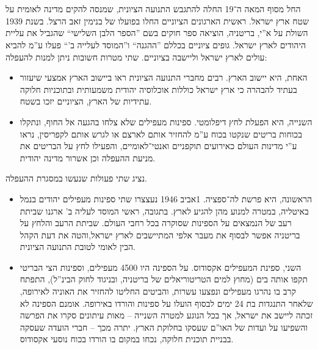 \documentclass[]{../../../../tex/classes/homework}
\begin{document}
	\section{}
	החל מסוף המאה ה־19 החלה להתגבש התנועה הציונית, שמנסה להקים מדינה לאומית על שטח ארץ ישראל. ראשית הארגונים הציוניים החלו בפועלו של בנימין זאב הרצל. בשנת 1939 השולת על א''י, בריטניה, הוציאה ספר חוקים בשם ''הספר הלבן השלישי`` שהגביל את עליית היהודים לארץ ישראל. גופים ציוניים בכללם ''ההגנה`` ו''המוסד לעלייה ב'`` פעלו ע''מ להביא עולים לארץ ישראל וליישבה בציוניים. שתי מטרות חשובות ניתן למנות להעפלה: 
	\begin{itemize}
		\item האחת, היא יישוב הארץ. רבים מחברי התנועה הציונית ראו ביישוב הארץ אמצעי שיעזור בעתיד להבהרה כי ארץ ישראל כוללות אוכלוסיה יהודית משמעותית ובתוכניות חלוקה עתידיות של הארץ, הציוניים יזכו בשטח. 
		\item השנייה, היא הפעלת לחץ דיפלומטי. ספינות מעפילים שלא צלחו בהגעה אל החוף, ונתקלו בכוחות בריטים שנקטו בכוח ע''מ להחזיר אותם לארצם או לגרש אותם לקפריסין, נראו ע''י מדינות העולם כאירועים תוקפניים ואנטי־לאומיים, והפעילו לחץ על הבריטים את מניעת ההעפלה וכן אשרור מדינה יהודית. 
	\end{itemize}
	נציג שתי פעולות שנעשו במסגרת ההעפלה. 
	\begin{itemize}
		\item הראשונה, היא פרשת לה־ספציה. 1אביב 1946 נעצצרו שתי ספינות מעפילים יהודים בנמל באיטליה, במטרה למנוע מהן להגיע לארץ. בתגובה, ראשי המוסד לעליה ב' ארגנו שביתת רעב של הנמצאים על הספינות שסוקרה בכל רחבי העולם. שביתת הרעב והלחץ על בריטניה אפשר לבסוף את מעבר אלפי המתיישבים לארץ ישראל,והטה את דעת הקהל הבין לאומי לטובת התנועה הציונית. 
		\item השני, ספינת המעפילים אקסודוס. על הספינה היו 4500 מעפילים, וספינות הצי הבריטי תקפו אותה בים (מחוץ למים הטריטוריאלים של בריטניה, ובניגוד לחוק הבינ''ל), התפתח קרב בו נהרגו מעפילים ונפצעו עשרות, והביטים החליטו להחזיר את האוניה לאירופה, שלאחר התנגדות בת 24 ימים לבסוף הועלו על ספינות והורדו באירופה. אומנם הספינה לא זכתה ליישב את ישראל, אך בכל הנוגע למטרה השנייה – מאות עיתונים סקרו את הפרשה והשפיעו על ועדות של האו''ם שעסקו בחלוקת הארץ. יתרה מכך – חברי הועדה שעסקה בבניית תוכנית חלוקה, נכחו במקום בו הורדו בכוח נוסעי אקסודוס. 
	\end{itemize}
	
\end{document}
